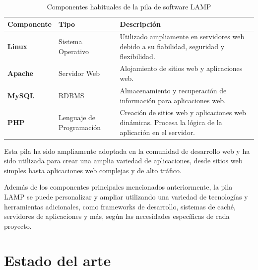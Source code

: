             \begin{table}[!htbp]
                  \centering
                  
                  \begin{tabular}{|>{\centering\arraybackslash}m{3cm}|>{\centering\arraybackslash}m{3cm}|>{\centering\arraybackslash}m{8cm}|}
                        \hline
                        \textbf{Componente} & \textbf{Tipo} & \textbf{Descripción} \\
                        \hline
                        \hline
                        \textbf{Linux} & Sistema Operativo & Utilizado ampliamente en servidores web debido a su fiabilidad, seguridad y flexibilidad. \\
                        \hline
                        \textbf{Apache} & Servidor Web & Alojamiento de sitios web y aplicaciones web. \\
                        \hline
                        \textbf{MySQL} & RDBMS & Almacenamiento y recuperación de información para aplicaciones web. \\
                        \hline
                        \textbf{PHP} & Lenguaje de Programación & Creación de sitios web y aplicaciones web dinámicas. Procesa la lógica de la aplicación en el servidor. \\
                        \hline
                  \end{tabular}

                  \caption{Componentes habituales de la pila de software LAMP}
                  \label{table:lamp}
            \end{table}

            Esta pila ha sido ampliamente adoptada en la comunidad de desarrollo web y ha sido utilizada para crear una amplia variedad de aplicaciones, desde sitios web simples hasta aplicaciones web complejas y de alto tráfico.

            Además de los componentes principales mencionados anteriormente, la pila LAMP se puede personalizar y ampliar utilizando una variedad de tecnologías y herramientas adicionales, como frameworks de desarrollo, sistemas de caché, servidores de aplicaciones y más, según las necesidades específicas de cada proyecto.

            \cleardoublepage

    
     
\chapter{Estado del arte}
    \label{cap:estado-arte}

